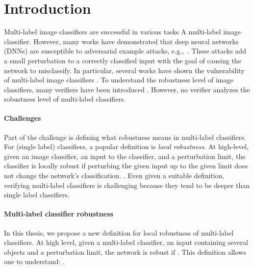 
\section{Introduction}

Multi-label image classifiers are successful in various tasks
 A multi-label image classifier.
However, many works have demonstrated that deep neural networks (DNNs) are susceptible to adversarial example attacks, e.g.,~\cite{ref7,ref15,szegedy2014intriguing,ref17,ref29,ref56}. These attacks add a small perturbation to a correctly classified input with the goal of causing the network to misclassify.
In particular, several works have shown the vulnerability of multi-label image classifiers .
To understand the robustness level of image classifiers, many verifiers have been introduced .
However, no verifier analyzes the robustness level of multi-label classifiers. %

\paragraph{Challenges} Part of the challenge is defining what robustness means in multi-label classifiers.
For (single label) classifiers, a popular definition is \emph{local robustness}. At high-level, given an image classifier, an input to the classifier, and a perturbation limit, the classifier is locally robust if perturbing the given input up to the given limit does not change the network's classification. .
Even given a suitable definition, verifying multi-label classifiers is challenging because they tend to be deeper than single label classifiers. 

\paragraph{Multi-label classifier robustness}
In this thesis, we propose a new definition for local robustness of multi-label classifiers. At high level, given a multi-label classifier, an input containing several objects and a perturbation limit, the network is robust if . This definition allows one to understand: .

